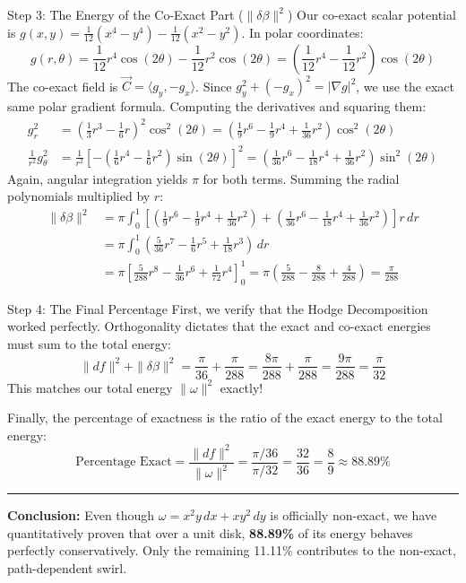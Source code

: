 \documentclass[11pt]{article}
\begin{document}
\begin{stepbox}{Step 3: The Energy of the Co-Exact Part ($\|\delta\beta\|^2$)}
Our co-exact scalar potential is $g(x,y) = \frac{1}{12}(x^4 - y^4) - \frac{1}{12}(x^2 - y^2)$. In polar coordinates:
\[ g(r,\theta) = \frac{1}{12}r^4\cos(2\theta) - \frac{1}{12}r^2\cos(2\theta) = \left( \frac{1}{12}r^4 - \frac{1}{12}r^2 \right) \cos(2\theta) \]
The co-exact field is $\vec{C} = \langle g_y, -g_x \rangle$. Since $g_y^2 + (-g_x)^2 = |\nabla g|^2$, we use the exact same polar gradient formula. Computing the derivatives and squaring them:
\begin{align*}
g_r^2 &= \left(\frac{1}{3}r^3 - \frac{1}{6}r\right)^2\cos^2(2\theta) = \left(\frac{1}{9}r^6 - \frac{1}{9}r^4 + \frac{1}{36}r^2\right)\cos^2(2\theta) \\
\frac{1}{r^2}g_\theta^2 &= \frac{1}{r^2}\left[ -\left(\frac{1}{6}r^4 - \frac{1}{6}r^2\right)\sin(2\theta) \right]^2 = \left(\frac{1}{36}r^6 - \frac{1}{18}r^4 + \frac{1}{36}r^2\right)\sin^2(2\theta)
\end{align*}
Again, angular integration yields $\pi$ for both terms. Summing the radial polynomials multiplied by $r$:
\begin{align*}
\|\delta\beta\|^2 &= \pi \int_0^1 \left[ \left(\frac{1}{9}r^6 - \frac{1}{9}r^4 + \frac{1}{36}r^2\right) + \left(\frac{1}{36}r^6 - \frac{1}{18}r^4 + \frac{1}{36}r^2\right) \right] r \, dr \\
&= \pi \int_0^1 \left( \frac{5}{36}r^7 - \frac{1}{6}r^5 + \frac{1}{18}r^3 \right) \, dr \\
&= \pi \left[ \frac{5}{288}r^8 - \frac{1}{36}r^6 + \frac{1}{72}r^4 \right]_0^1 = \pi \left( \frac{5}{288} - \frac{8}{288} + \frac{4}{288} \right) = \frac{\pi}{288}
\end{align*}
\end{stepbox}

\begin{stepbox}{Step 4: The Final Percentage}
First, we verify that the Hodge Decomposition worked perfectly. Orthogonality dictates that the exact and co-exact energies must sum to the total energy:
\[ \|df\|^2 + \|\delta\beta\|^2 = \frac{\pi}{36} + \frac{\pi}{288} = \frac{8\pi}{288} + \frac{\pi}{288} = \frac{9\pi}{288} = \frac{\pi}{32} \]
This matches our total energy $\|\omega\|^2$ exactly!

Finally, the percentage of exactness is the ratio of the exact energy to the total energy:
\[ \text{Percentage Exact} = \frac{\|df\|^2}{\|\omega\|^2} = \frac{\pi/36}{\pi/32} = \frac{32}{36} = \frac{8}{9} \approx 88.89\% \]

\vspace{0.5em}
\hrule
\vspace{0.5em}
\textbf{Conclusion:} Even though $\omega = x^2y \, dx + xy^2 \, dy$ is officially non-exact, we have quantitatively proven that over a unit disk, \textbf{88.89\%} of its energy behaves perfectly conservatively. Only the remaining 11.11\% contributes to the non-exact, path-dependent swirl.
\end{stepbox}
\end{document}
